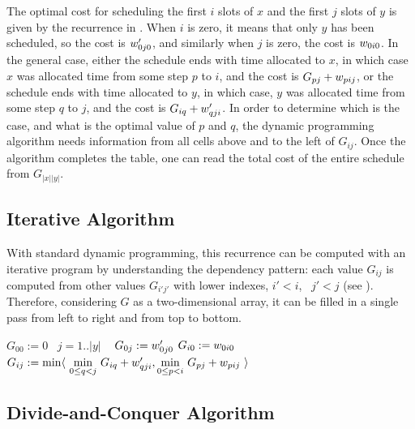 The optimal cost for scheduling the first $i$ slots of $x$ and the first $j$ slots
of $y$ is given by the recurrence in . When $i$ is zero, it means that
only $y$ has been scheduled, so the cost is $w'_{0j0}$, and similarly when $j$ is zero, 
the cost is $w_{0i0}$. In the general case, either the schedule ends with time allocated to $x$, 
in which case $x$ was allocated time from some step $p$ to $i$, and the cost is 
$G_{pj} + w_{pij}$, or the schedule ends with time allocated to $y$, in which case, 
$y$ was allocated time from some step $q$ to $j$, and the cost is $G_{iq} + w'_{qji}$.
In order to determine which is the case, and what is the optimal value of $p$ and $q$, 
the dynamic programming algorithm needs information from all cells above and to the left of $G_{ij}$.
Once the algorithm completes the table, one can read the total cost of the entire schedule from $G_{|x||y|}$.

\subsection{Iterative Algorithm}
\label{intro:iterative}

With standard dynamic programming, this recurrence can be computed
with an iterative program by understanding the dependency pattern:
each value $G_{ij}$ is computed from other values $G_{i'j'}$ with lower
indexes, $i'<i$, ~$j'<j$ (see ). 
Therefore, considering $G$ as a two-dimensional array, it can be filled in a single pass from left to right and from top
to bottom.

\newcommand\FORLINE[1]{\STATE\algorithmicfor~{#1} \algorithmicdo~}

\begin{algorithm}
\renewcommand\arraystretch{1.3}
\begin{algorithmic}
  \STATE $G_{00} := 0$
  \FORLINE{$j=1..|y|$}  $G_{0j} := w'_{0j0}$  
    \STATE $G_{i0} := w_{0i0}$
      \STATE $G_{ij} :=
        \begin{array}[t]{@{}l@{~}l} 
          \min\langle & \underset{0\leq q<j}\min ~ G_{iq} + \yw{qji}, \underset{0\leq p<i}\min ~ G_{pj} + \xw{pij}~\rangle \\         
        \end{array}$
    \ENDFOR
  \ENDFOR
\end{algorithmic}
\end{algorithm}


\subsection{Divide-and-Conquer Algorithm}

